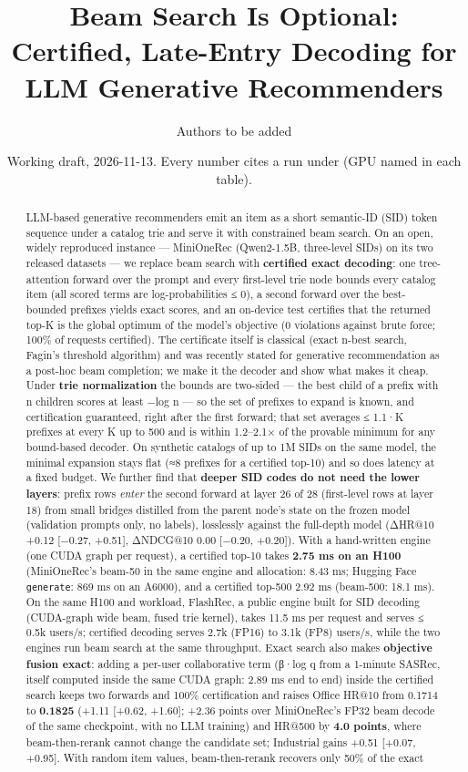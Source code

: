 \documentclass[11pt]{article}
\title{Beam Search Is Optional: Certified, Late-Entry Decoding for LLM Generative Recommenders}
\author{Authors to be added}
\date{\small Working draft, 2026-11-13. Every number cites a run under \code{runs/\allowbreak{}} (GPU named in each table).}
\newcommand{\code}[1]{\texttt{#1}}
\begin{document}
\maketitle
\begin{abstract}
LLM-based generative recommenders emit an item as a short semantic-ID (SID) token sequence under a catalog trie and serve it with constrained beam search. On an open, widely reproduced instance — MiniOneRec (Qwen2-1.5B, three-level SIDs) on its two released datasets — we replace beam search with \textbf{certified exact decoding}: one tree-attention forward over the prompt and every first-level trie node bounds every catalog item (all scored terms are log-probabilities ≤ 0), a second forward over the best-bounded prefixes yields exact scores, and an on-device test certifies that the returned top-K is the global optimum of the model's objective (0 violations against brute force; 100\% of requests certified). The certificate itself is classical (exact n-best search, Fagin's threshold algorithm) and was recently stated for generative recommendation as a post-hoc beam completion; we make it the decoder and show what makes it cheap. Under \textbf{trie normalization} the bounds are two-sided — the best child of a prefix with n children scores at least −log n — so the set of prefixes to expand is known, and certification guaranteed, right after the first forward; that set averages ≤ 1.1·K prefixes at every K up to 500 and is within 1.2–2.1× of the provable minimum for any bound-based decoder. On synthetic catalogs of up to 1M SIDs on the same model, the minimal expansion stays flat (≈8 prefixes for a certified top-10) and so does latency at a fixed budget. We further find that \textbf{deeper SID codes do not need the lower layers}: prefix rows \emph{enter} the second forward at layer 26 of 28 (first-level rows at layer 18) from small bridges distilled from the parent node's state on the frozen model (validation prompts only, no labels), losslessly against the full-depth model (ΔHR@10 +0.12 [−0.27, +0.51], ΔNDCG@10 0.00 [−0.20, +0.20]). With a hand-written engine (one CUDA graph per request), a certified top-10 takes \textbf{2.75 ms on an H100} (MiniOneRec's beam-50 in the same engine and allocation: 8.43 ms; Hugging Face \code{generate}: 869 ms on an A6000), and a certified top-500 2.92 ms (beam-500: 18.1 ms). On the same H100 and workload, FlashRec, a public engine built for SID decoding (CUDA-graph wide beam, fused trie kernel), takes 11.5 ms per request and serves ≤ 0.5k users/s; certified decoding serves 2.7k (FP16) to 3.1k (FP8) users/s, while the two engines run beam search at the same throughput. Exact search also makes \textbf{objective fusion exact}: adding a per-user collaborative term (β·log q from a 1-minute SASRec, itself computed inside the same CUDA graph: 2.89 ms end to end) inside the certified search keeps two forwards and 100\% certification and raises Office HR@10 from 0.1714 to \textbf{0.1825} (+1.11 [+0.62, +1.60]; +2.36 points over MiniOneRec's FP32 beam decode of the same checkpoint, with no LLM training) and HR@500 by \textbf{4.0 points}, where beam-then-rerank cannot change the candidate set; Industrial gains +0.51 [+0.07, +0.95]. With random item values, beam-then-rerank recovers only 50\% of the exact 
\end{abstract}
\end{document}
